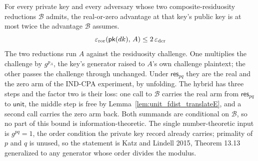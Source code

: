 \begin{theorem}
  \label{thm:paillier_dcr_epsilon_le}
  \rocqok
  For every private key and every adversary whose two composite-residuosity
  reductions $\mathcal{B}$ admits, the real-or-zero advantage at that key's
  public key is at most twice the advantage $\mathcal{B}$ assumes.
  \[ \varepsilon_{\mathrm{ror}}(\mathsf{pk}(dk),\,A) \le 2\,\varepsilon_{\mathrm{dcr}} \]
  The two reductions run $A$ against the residuosity challenge. One multiplies
  the challenge by $g^{p_A}$, the key's generator raised to $A$'s own challenge
  plaintext; the other passes the challenge through unchanged. Under
  $\mathsf{res}_{pq}$ they are the real and the zero arm of the IND-CPA
  experiment, by unfolding. The hybrid has three steps and the factor two is
  their loss: one call to $\mathcal{B}$ carries the real arm from
  $\mathsf{res}_{pq}$ to $\mathsf{unit}$, the middle step is free by
  Lemma~\ref{lem:unit_fdist_translateE}, and a second call carries the zero arm
  back. Both summands are conditional on $\mathcal{B}$, so no part of this
  bound is information-theoretic. The single number-theoretic input is
  $g^{pq} = 1$, the order condition the private key record already carries;
  primality of $p$ and $q$ is unused, so the statement is Katz and Lindell
  2015, Theorem 13.13 generalized to any generator whose order divides the
  modulus.
\end{theorem}

